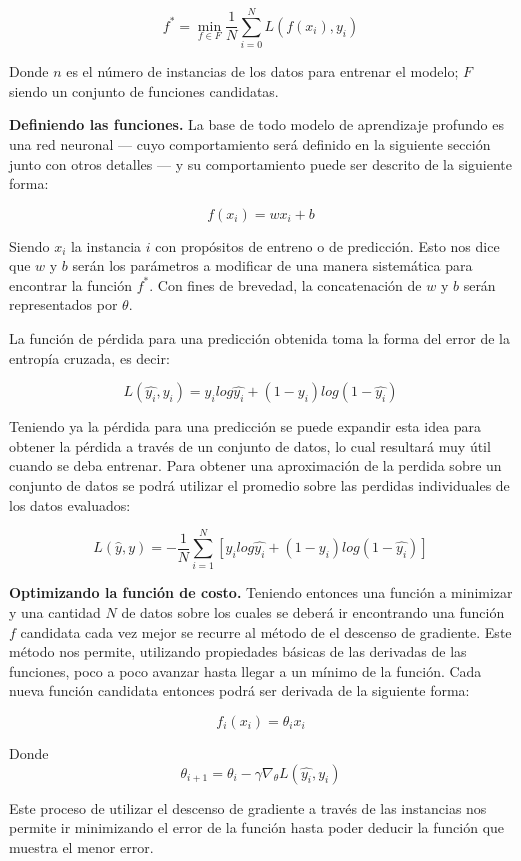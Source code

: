$$f^* = \min_{f \in F} \frac{1}{N} \sum_{i = 0}^{N} L(f(x_i), y_i)$$

Donde $n$ es el número de instancias de los datos para entrenar el modelo; $F$ siendo un conjunto de funciones candidatas.

\textbf{Definiendo las funciones.} La base de todo modelo de aprendizaje profundo es una red neuronal --- cuyo comportamiento será definido en la siguiente sección junto con otros detalles --- y su comportamiento puede ser descrito de la siguiente forma:

$$ f(x_i) = w x_i + b $$

Siendo $x_i$ la instancia $i$ con propósitos de entreno o de predicción. Esto nos dice que $w$ y $b$ serán los parámetros a modificar de una manera sistemática para encontrar la función $f^*$. Con fines de brevedad, la concatenación de $w$ y $b$ serán representados por $\theta$.

La función de pérdida para una predicción obtenida toma la forma del error de la entropía cruzada, es decir:

$$ L(\hat{y_i}, y_i) = y_i log\hat{y_i} + (1 - y_i)log(1 - \hat{y_i}) $$

Teniendo ya la pérdida para una predicción se puede expandir esta idea para obtener la pérdida a través de un conjunto de datos, lo cual resultará muy útil cuando se deba entrenar. Para obtener una aproximación de la perdida sobre un conjunto de datos se podrá utilizar el promedio sobre las perdidas individuales de los datos evaluados:

$$ L(\hat{y}, y) = - \frac{1}{N} \sum_{i = 1}^{N} [y_i log\hat{y_i} + (1 - y_i)log(1 - \hat{y_i})] $$

\textbf{Optimizando la función de costo.} Teniendo entonces una función a minimizar y una cantidad $N$ de datos sobre los cuales se deberá ir encontrando una función $f$ candidata cada vez mejor se recurre al método de el descenso de gradiente. Este método nos permite, utilizando propiedades básicas de las derivadas de las funciones, poco a poco avanzar hasta llegar a un mínimo de la función. Cada nueva función candidata entonces podrá ser derivada de la siguiente forma:

$$ f_i(x_i) = \theta_i x_i $$

Donde
\begin{equation}
\label{eq:sgdupdate}
\theta_{i + 1} = \theta_{i} - \gamma \nabla_{\theta} L(\hat{y_i}, y_i)
\end{equation}

Este proceso de utilizar el descenso de gradiente a través de las instancias nos permite ir minimizando el error de la función hasta poder deducir la función que muestra el menor error.

